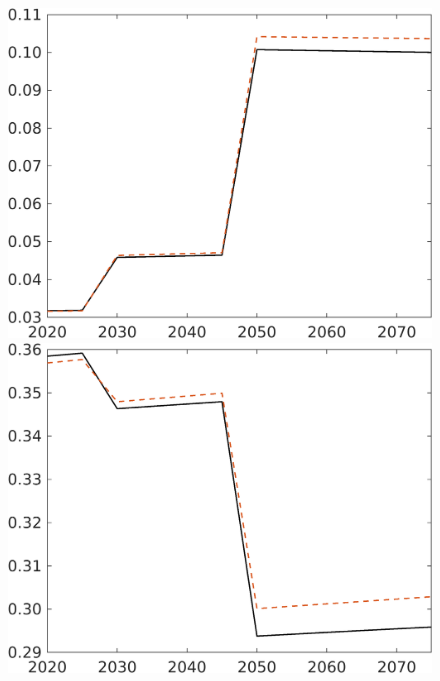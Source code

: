 \begin{figure}[h!!]
\begin{minipage}[]{0.32\textwidth}
\end{minipage}
	\begin{minipage}[]{0.32\textwidth}
		\includegraphics[width=1\textwidth]{../../codding_model/own_basedOnFried/optimalPol_elastS_DisuSci/figures/all_1705/comp_notaul_OPT_T_NoTaus_sg_spillover0_sep1_BN0_ineq0_etaa0.79.png}
	\end{minipage}
\begin{minipage}[]{0.32\textwidth}
	\includegraphics[width=1\textwidth]{../../codding_model/own_basedOnFried/optimalPol_elastS_DisuSci/figures/all_1705/comp_notaul_OPT_T_NoTaus_sn_spillover0_sep1_BN0_ineq0_etaa0.79.png}
\end{minipage}


\end{figure}
